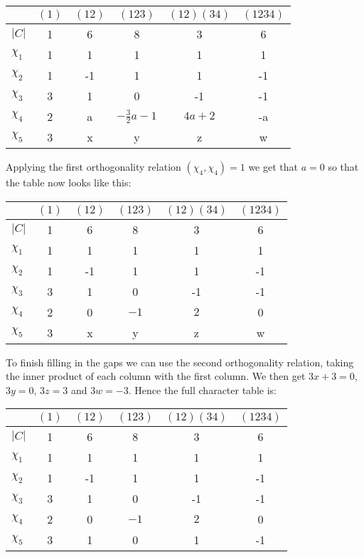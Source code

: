 \documentclass[11pt]{article} \usepackage{amssymb}
\begin{document}
\begin{table}[h]
\begin{center}
{\small
\begin{tabular}{ l | c | c | c | c | c }
  & $(1)$ & $(12)$ & $(123)$ & $(12)(34)$ & $(1234)$ \\
\hline
$|C|$ & 1 & 6 & 8 & 3 & 6\\
\hline
$\chi_1$ & 1 & 1 & 1 & 1 & 1\\
$\chi_2$ & 1 & -1 & 1 & 1 & -1\\
$\chi_3$ & 3 & 1 & 0 & -1 & -1\\
$\chi_4$ & 2 & a & $-\frac{3}{2}a-1$ & $4a+2$ & -a\\
$\chi_5$ & 3 & x & y & z & w\\
\end{tabular}
}
\end{center}
\end{table}

\pagebreak
Applying the first orthogonality relation $(\chi_4,\chi_4)=1$ we get
that $a=0$ so that the table now looks like this:

\begin{table}[h]
\begin{center}
{\small
\begin{tabular}{ l | c | c | c | c | c }
  & $(1)$ & $(12)$ & $(123)$ & $(12)(34)$ & $(1234)$ \\
\hline
$|C|$ & 1 & 6 & 8 & 3 & 6\\
\hline
$\chi_1$ & 1 & 1 & 1 & 1 & 1\\
$\chi_2$ & 1 & -1 & 1 & 1 & -1\\
$\chi_3$ & 3 & 1 & 0 & -1 & -1\\
$\chi_4$ & 2 & 0 & $-1$ & $2$ & 0\\
$\chi_5$ & 3 & x & y & z & w\\
\end{tabular}
}
\end{center}
\end{table}

To finish filling in the gaps we can use the second orthogonality
relation, taking the inner product of each column with the first
column. We then get $3x+3=0$, $3y=0$, $3z=3$ and $3w=-3$. Hence the
full character table is:


\begin{table}[h]
\begin{center}
{\small
\begin{tabular}{ l | c | c | c | c | c }
  & $(1)$ & $(12)$ & $(123)$ & $(12)(34)$ & $(1234)$ \\
\hline
$|C|$ & 1 & 6 & 8 & 3 & 6\\
\hline
$\chi_1$ & 1 & 1 & 1 & 1 & 1\\
$\chi_2$ & 1 & -1 & 1 & 1 & -1\\
$\chi_3$ & 3 & 1 & 0 & -1 & -1\\
$\chi_4$ & 2 & 0 & $-1$ & $2$ & 0\\
$\chi_5$ & 3 & 1 & 0 & 1 & -1\\
\end{tabular}
}
\end{center}
\end{table}
\end{document}
